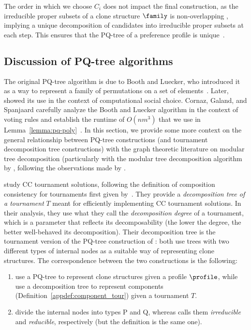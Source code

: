 The order in which we choose $C_i$ does not impact the final construction, as the irreducible proper subsets of a clone structure $\family$ is non-overlapping \cite[Proposition 4.2.]{Elkind10:Clone}, implying a unique decomposition of candidates into irreducible proper subsets at each step. This ensures that the PQ-tree of a preference profile is unique~\citep{Karpov19:Group}.

\subsection{Discussion of PQ-tree algorithms}\label{sec:app:pq-trees}

The original PQ-tree algorithm is due to Booth and Luecker, who introduced it as a way to represent a family of permutations on a set of elements~\citep{Booth76:Testing}.
Later, \citet{Elkind10:Clone} showed its use in the context of computational social choice.
Cornaz, Galand, and Spanjaard carefully analyze the Booth and Luecker algorithm in the context of voting rules and establish the runtime of $O(nm^3)$ that we use in Lemma~\ref{lemma:pq-poly}~\citep{Cornaz13:Kemeny}.
In this section, we provide some more context on the general relationship between PQ-tree constructions (and tournament decomposition tree constructions) with the graph theoretic literature on modular tree decomposition (particularly with the modular tree decomposition algorithm by \citet{Capelle02:Graph}, following the observations made by \citet{Brandt11:Fixed}.

\citet{Brandt11:Fixed} study CC tournament solutions, following the definition of composition consistency for tournaments first given by~\citep{Laffond96:Composition}.
They provide a \emph{decomposition tree of a tournament} $T$ meant for efficiently implementing CC tournament solutions.
In their analysis, they use what they call the \emph{decomposition degree} of a tournament, which is a parameter that reflects its decomposability (the lower the degree, the better well-behaved its decomposition).
Their decomposition tree is the tournament version of the PQ-tree construction of \citet{Elkind10:Clone}: both use trees with two different types of internal nodes as a suitable way of representing clone structures.
The correspondence between the two constructions is the following:
\begin{enumerate}
    \item \citet{Elkind10:Clone} use a PQ-tree to represent clone structures given a profile $\profile$, while \citet{Brandt11:Fixed} use a decomposition tree to represent components (Definition~\ref{appdef:component_tour}) given a tournament $T$.
    \item \citet{Elkind10:Clone} divide the internal nodes into types P and Q, whereas \citet{Brandt18:Extending} calls them \emph{irreducible} and \emph{reducible}, respectively (but the definition is the same one).
\end{enumerate}

